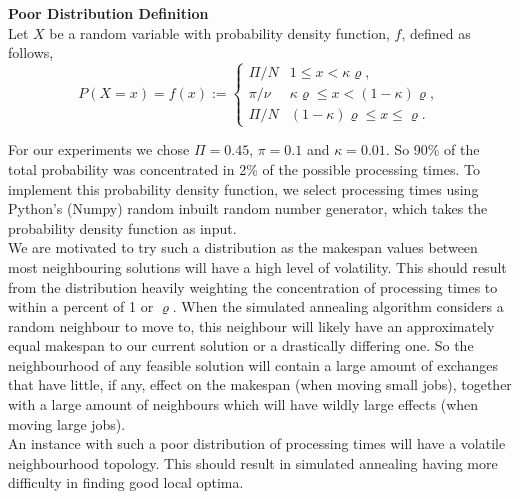 \documentclass[12pt,a4paper,reqno]{article}
\begin{document}
{\bf Poor Distribution Definition}\\
Let $X$ be a random variable with probability density function, $f$, defined as follows,
\[
P(X=x)=f(x) :=
\begin{cases}
      \Pi/N & 1 \leq x < \kappa\varrho, \\
      \pi/\nu & \kappa\varrho \leq x < (1-\kappa)\varrho, \\
      \Pi/N & (1-\kappa)\varrho\leq x \leq \varrho .
   \end{cases}\textbf{}
\]

For our experiments we chose $\Pi=0.45$, $\pi=0.1$ and $\kappa=0.01$. So 90\% of the total probability was concentrated in 2\% of the possible processing times. To implement this probability density function, we select processing times using Python's (Numpy) random inbuilt random number generator, which takes the probability density function as input. \\

We are motivated to try such a distribution as the makespan values between most neighbouring solutions will have a high level of volatility. This should result from the distribution heavily weighting the concentration of processing times to within a percent of 1 or $\varrho$. When the simulated annealing algorithm considers a random neighbour to move to, this neighbour will likely have an approximately equal makespan to our current solution or a drastically differing one. So the neighbourhood of any feasible solution will contain a large amount of exchanges that have little, if any, effect on the makespan (when moving small jobs), together with a large amount of neighbours which will have wildly large effects (when moving large jobs). \\

An instance with such a poor distribution of processing times will have a volatile neighbourhood topology. This should result in simulated annealing having more difficulty in finding good local optima.

\end{document}
